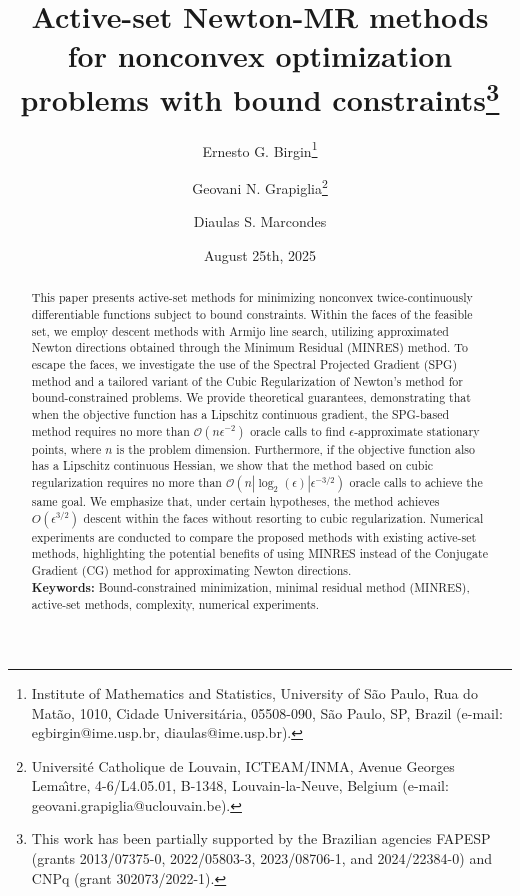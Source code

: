 \documentclass[11pt]{article}
\begin{document}
\title{\textbf{Active-set Newton-MR methods for nonconvex optimization problems with bound constraints}\thanks{This work has been partially supported by the Brazilian agencies FAPESP (grants 2013/07375-0, 2022/05803-3, 2023/08706-1, and 2024/22384-0) and CNPq (grant 302073/2022-1).}}

\author{
    Ernesto G. Birgin\thanks{Institute of Mathematics and Statistics, University of S\~ao Paulo, Rua do Mat\~ao, 1010, Cidade Universit\'aria, 05508-090, S\~ao Paulo, SP, Brazil (e-mail: egbirgin@ime.usp.br, diaulas@ime.usp.br).}
    \and
    Geovani N. Grapiglia\thanks{Université Catholique de Louvain, ICTEAM/INMA, Avenue Georges Lema\^{\i}tre, 4-6/L4.05.01, B-1348, Louvain-la-Neuve, Belgium (e-mail: geovani.grapiglia@uclouvain.be).}
    \and
    Diaulas S. Marcondes\footnotemark[2]
}

\date{August 25th, 2025}

\maketitle

\begin{abstract}
This paper presents active-set methods for minimizing nonconvex twice-continuously differentiable functions subject to bound constraints. Within the faces of the feasible set, we employ descent methods with Armijo line search, utilizing approximated Newton directions obtained through the Minimum Residual (MINRES) method. To escape the faces, we investigate the use of the Spectral Projected Gradient (SPG) method and a tailored variant of the Cubic Regularization of Newton's method for bound-constrained problems. We provide theoretical guarantees, demonstrating that when the objective function has a Lipschitz continuous gradient, the SPG-based method requires no more than $\mathcal{O}(n\epsilon^{-2})$ oracle calls to find $\epsilon$-approximate stationary points, where $n$ is the problem dimension. Furthermore, if the objective function also has a Lipschitz continuous Hessian, we show that the method based on cubic regularization requires no more than $\mathcal{O}\left(n|\log_{2}(\epsilon)|\epsilon^{-3/2}\right)$ oracle calls to achieve the same goal. We emphasize that, under certain hypotheses, the method achieves $O(\epsilon^{3/2})$ descent within the faces without resorting to cubic regularization. Numerical experiments are conducted to compare the proposed methods with existing active-set methods, highlighting the potential benefits of using MINRES instead of the Conjugate Gradient (CG) method for approximating Newton directions.\\

\noindent\textbf{Keywords:} Bound-constrained minimization, minimal residual method (MINRES), active-set methods, complexity, numerical experiments.
\end{abstract}
\end{document}
